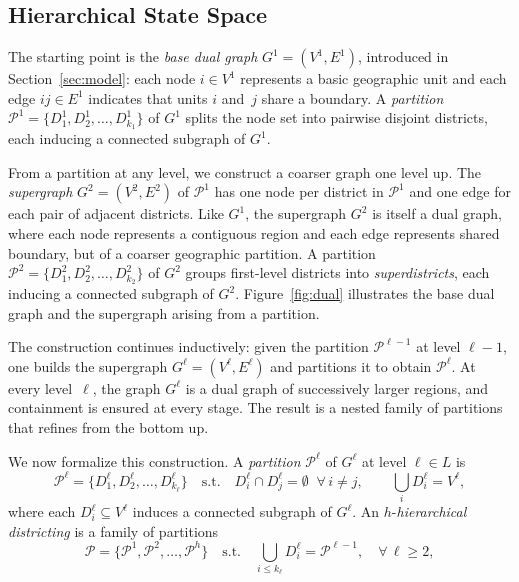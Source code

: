 \documentclass[preprint,12pt,authoryear]{elsarticle}
\theoremstyle{definition}
\begin{document}
\subsection{Hierarchical State Space}
\label{sec:statespace}

The starting point is the \emph{base dual graph}
$G^1 = (V^1, E^1)$, introduced in Section~\ref{sec:model}: each node
$i \in V^1$ represents a basic geographic unit and each edge $ij \in E^1$
indicates that units $i$ and~$j$ share a boundary.  A \emph{partition}
$\mathcal{P}^1 = \{D_1^1, D_2^1, \ldots, D_{k_1}^1\}$ of $G^1$ splits
the node set into pairwise disjoint districts, each inducing a connected
subgraph of $G^1$.

From a partition at any level, we construct a coarser graph one level up.
The \emph{supergraph} $G^2 = (V^2, E^2)$ of $\mathcal{P}^1$ has one node
per district in $\mathcal{P}^1$ and one edge for each pair of adjacent
districts.  Like $G^1$, the supergraph $G^2$ is itself a dual graph, where
each node represents a contiguous region and each edge represents shared
boundary, but of a coarser geographic partition.  A partition
$\mathcal{P}^2 = \{D_1^2, D_2^2, \ldots, D_{k_2}^2\}$ of $G^2$ groups
first-level districts into \emph{superdistricts}, each inducing a connected
subgraph of $G^2$.  Figure~\ref{fig:dual} illustrates the base dual graph
and the supergraph arising from a partition.

The construction continues inductively: given the partition
$\mathcal{P}^{\ell-1}$ at level $\ell - 1$, one builds the supergraph
$G^\ell = (V^\ell, E^\ell)$ and partitions it to obtain
$\mathcal{P}^\ell$.  At every level~$\ell$, the graph $G^\ell$ is a dual
graph of successively larger regions, and containment is ensured at every
stage.  The result is a nested family of partitions that refines from the
bottom up.

We now formalize this construction. A \emph{partition} $\mathcal{P}^\ell$ of
$G^\ell$ at level $\ell \in L$ is
%
\begin{equation}\label{eq:partition}
    \mathcal{P}^\ell = \{D_1^\ell, D_2^\ell, \dots, D_{k_\ell}^\ell\}
    \quad \text{s.t.} \quad
    D^\ell_i \cap D^\ell_j = \emptyset \;\; \forall\, i \neq j, \qquad \textstyle\bigcup_{i} D^\ell_i = V^\ell,
\end{equation}
%
where each $D_i^\ell \subseteq V^\ell$ induces a connected subgraph of
$G^\ell$. An $h$-\emph{hierarchical districting} is a family of partitions
%
\begin{equation}\label{eq:hierarchy}
    \mathcal{P} = \{\mathcal{P}^1, \mathcal{P}^2, \ldots, \mathcal{P}^h\}
    \quad \text{s.t.} \quad
    \bigcup_{i \leq k_\ell} D_i^\ell = \mathcal{P}^{\ell-1},
    \quad \forall\, \ell \geq 2,
\end{equation}
%
\end{document}
